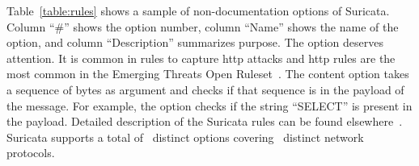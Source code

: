 \documentclass[conference]{IEEEtran}
\begin{document}
Table~\ref{table:rules} shows a sample of non-documentation options  of
Suricata. Column ``\#'' shows the option number, column ``Name'' shows
the name of the option, and column ``Description'' summarizes
purpose. The option  deserves attention. It is common
in rules to capture http attacks and http rules are the most common in
the Emerging Threats Open Ruleset~\cite{emerging-threats-open}. The
content option takes a sequence of bytes as argument and checks if
that sequence is in the payload of the message.  For example, the
option  checks if the string ``SELECT'' is
present in the payload.  Detailed description of the Suricata rules
can be found elsewhere~\cite{suri-rule-format}. Suricata supports a
total of \totoptions\ distinct options covering \numproto\ distinct
network protocols.




  
\end{document}

